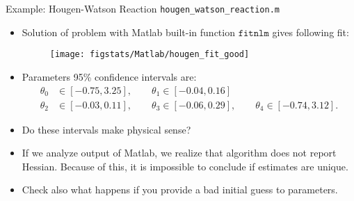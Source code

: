 \documentclass[9pt]{beamer}
\begin{document}
%
\begin{frame}{Example: Hougen-Watson Reaction \footnotesize{\texttt{hougen\_watson\_reaction.m}}}

\begin{itemize}
\setlength{\itemsep}{3pt}
\item Solution of problem with Matlab built-in function $\texttt{fitnlm}$ gives following fit:
\begin{figure}[!htb]
    \centering
	\texttt{[image: figstats/Matlab/hougen\_fit\_good]}
\end{figure}
\item Parameters 95\% confidence intervals are:
\begin{align*}
\theta_0&\in [-0.75, 3.25],\qquad \theta_1\in [-0.04, 0.16]\\
\theta_2&\in [-0.03 ,0.11],\qquad \theta_3\in [-0.06, 0.29],\qquad \theta_4\in [ -0.74,3.12].
\end{align*}
\item Do these intervals make physical sense?
\pause 
\item If we analyze output of Matlab, we realize that algorithm does not report Hessian. Because of this, it is impossible to conclude if estimates are unique. 
\item Check also what happens if you provide a bad initial guess to parameters. 
\end{itemize}


\end{frame}
\end{document}
